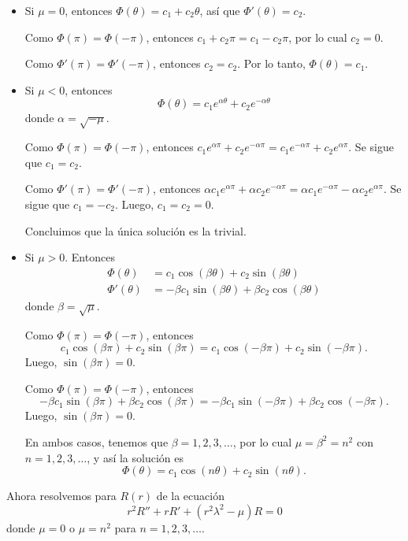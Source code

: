 \documentclass[11pt,letterpaper,draft]{report}
\newcommand\<{\langle}
\renewcommand\>{\rangle}
\begin{document}
\begin{itemize}
  \item
    Si $\mu=0$, entonces $\Phi(\theta)=c_1+c_2\theta$, así que
    $\Phi'(\theta)=c_2$.

    Como $\Phi(\pi)=\Phi(-\pi)$, entonces $c_1+c_2\pi=c_1-c_2\pi$,
    por lo cual $c_2=0$.
    
    Como $\Phi'(\pi)=\Phi'(-\pi)$, entonces $c_2=c_2$. Por
    lo tanto, $\Phi(\theta)=c_1$.
  
  \item
    Si $\mu<0$, entonces
    \[
       \Phi(\theta)
       =c_1e^{\alpha\theta}+
       c_2e^{-\alpha\theta}
    \]
    donde $\alpha=\sqrt{-\mu}$.

    Como $\Phi(\pi)=\Phi(-\pi)$, entonces
    $c_1e^{\alpha\pi}+c_2e^{-\alpha\pi}
    =c_1e^{-\alpha\pi}+c_2e^{\alpha\pi}$. Se sigue que
    $c_1=c_2$.

    Como $\Phi'(\pi)=\Phi'(-\pi)$, entonces
    $\alpha c_1e^{\alpha\pi}+\alpha c_2e^{-\alpha\pi}
    = \alpha c_1e^{-\alpha\pi}-\alpha c_2e^{\alpha\pi}$. Se
    sigue que $c_1=-c_2$. Luego, $c_1=c_2=0$.
    
    Concluimos que la única solución es la trivial.

  \item
    Si $\mu>0$. Entonces
    \begin{align*}
      \Phi(\theta) &=
      c_1\cos(\beta\theta)+c_2\sin(\beta\theta) \\
      \Phi'(\theta) &=
      -\beta c_1\sin(\beta\theta)+\beta c_2\cos(\beta\theta)
    \end{align*}
    donde $\beta=\sqrt\mu$.
    
    Como $\Phi(\pi)=\Phi(-\pi)$, entonces
    \[
      c_1\cos(\beta\pi)+c_2\sin(\beta\pi)
      =
      c_1\cos(-\beta\pi)+c_2\sin(-\beta\pi)
    .\]
    Luego, $\sin(\beta\pi)=0$.

    Como $\Phi(\pi)=\Phi(-\pi)$, entonces
    \[
      -\beta c_1\sin(\beta\pi)+\beta c_2\cos(\beta\pi)
      =
      -\beta c_1\sin(-\beta\pi)+\beta c_2\cos(-\beta\pi)
    .\]
    Luego, $\sin(\beta\pi)=0$.

    En ambos casos, tenemos que $\beta=1,2,3,\dots$, por lo
    cual $\mu=\beta^{2}=n^{2}$ con $n=1,2,3,\dots$, y así la solución es
    \[
      \Phi(\theta) = c_1\cos(n\theta) + c_2\sin(n\theta).
    \] 
    
\end{itemize}

\noindent Ahora resolvemos para $R(r)$ de la ecuación
\[
  r^{2}R'' +rR' +(r^{2}\lambda^{2}-\mu)R = 0
\]
donde $\mu=0$ o $\mu=n^{2}$ para $n=1,2,3,\dots$.
\end{document}
